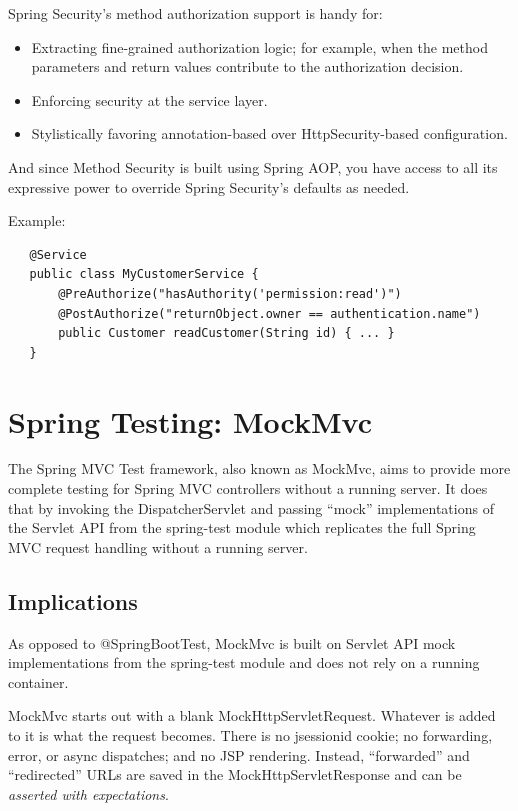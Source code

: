 \documentclass{scrartcl}
\begin{document}
Spring Security’s method authorization support is handy for:

\begin{itemize}
    \item Extracting fine-grained authorization logic; for example, when the method parameters and return values contribute to the authorization decision.
    \item Enforcing security at the service layer.
    \item Stylistically favoring annotation-based over HttpSecurity-based configuration.
\end{itemize}

And since Method Security is built using Spring AOP, you have access to all its expressive power to override Spring Security’s defaults as needed.

Example:

\begin{lstlisting}
   @Service
   public class MyCustomerService {
       @PreAuthorize("hasAuthority('permission:read')")
       @PostAuthorize("returnObject.owner == authentication.name")
       public Customer readCustomer(String id) { ... }
   }
\end{lstlisting}

\section{Spring Testing: MockMvc}

The Spring MVC Test framework, also known as MockMvc, aims to provide more complete testing for Spring MVC controllers without a running server. It does that by invoking the DispatcherServlet and passing “mock” implementations of the Servlet API from the spring-test module which replicates the full Spring MVC request handling without a running server.

\subsection{Implications}

As opposed to @SpringBootTest, MockMvc is built on Servlet API mock implementations from the spring-test module and does not rely on a running container.

MockMvc starts out with a blank MockHttpServletRequest. Whatever is added to it is what the request becomes. There is no jsessionid cookie; no forwarding, error, or async dispatches; and no JSP rendering. Instead, “forwarded” and “redirected” URLs are saved in the MockHttpServletResponse and can be \textit{asserted with expectations}.
\end{document}
